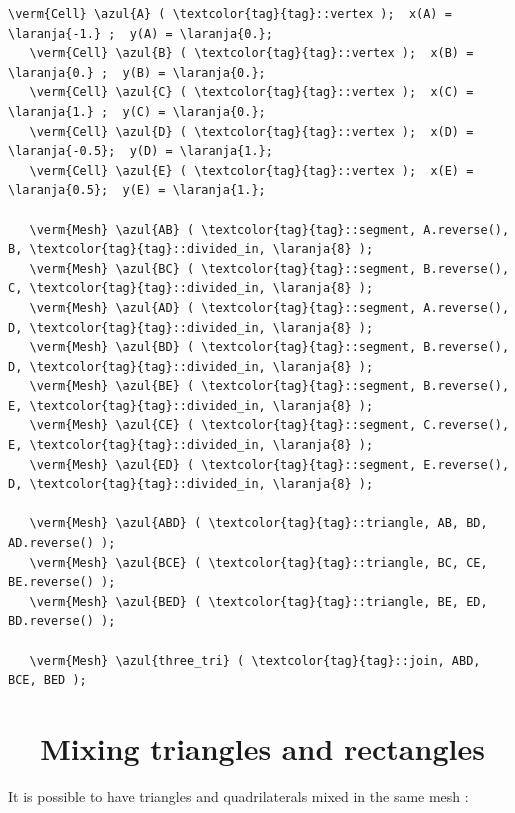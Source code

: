 \begin{Verbatim}[commandchars=\\\{\},formatcom=\small\tt,frame=single,
   label=parag-\ref{\numb section 1.\numb parag 4}.cpp,rulecolor=\color{coment},
   baselinestretch=0.94,framesep=2mm]
   \verm{Cell} \azul{A} ( \textcolor{tag}{tag}::vertex );  x(A) = \laranja{-1.} ;  y(A) = \laranja{0.};
   \verm{Cell} \azul{B} ( \textcolor{tag}{tag}::vertex );  x(B) =  \laranja{0.} ;  y(B) = \laranja{0.};
   \verm{Cell} \azul{C} ( \textcolor{tag}{tag}::vertex );  x(C) =  \laranja{1.} ;  y(C) = \laranja{0.};
   \verm{Cell} \azul{D} ( \textcolor{tag}{tag}::vertex );  x(D) = \laranja{-0.5};  y(D) = \laranja{1.};
   \verm{Cell} \azul{E} ( \textcolor{tag}{tag}::vertex );  x(E) =  \laranja{0.5};  y(E) = \laranja{1.};

   \verm{Mesh} \azul{AB} ( \textcolor{tag}{tag}::segment, A.reverse(), B, \textcolor{tag}{tag}::divided_in, \laranja{8} );
   \verm{Mesh} \azul{BC} ( \textcolor{tag}{tag}::segment, B.reverse(), C, \textcolor{tag}{tag}::divided_in, \laranja{8} );
   \verm{Mesh} \azul{AD} ( \textcolor{tag}{tag}::segment, A.reverse(), D, \textcolor{tag}{tag}::divided_in, \laranja{8} );
   \verm{Mesh} \azul{BD} ( \textcolor{tag}{tag}::segment, B.reverse(), D, \textcolor{tag}{tag}::divided_in, \laranja{8} );
   \verm{Mesh} \azul{BE} ( \textcolor{tag}{tag}::segment, B.reverse(), E, \textcolor{tag}{tag}::divided_in, \laranja{8} );
   \verm{Mesh} \azul{CE} ( \textcolor{tag}{tag}::segment, C.reverse(), E, \textcolor{tag}{tag}::divided_in, \laranja{8} );
   \verm{Mesh} \azul{ED} ( \textcolor{tag}{tag}::segment, E.reverse(), D, \textcolor{tag}{tag}::divided_in, \laranja{8} );

   \verm{Mesh} \azul{ABD} ( \textcolor{tag}{tag}::triangle, AB, BD, AD.reverse() );
   \verm{Mesh} \azul{BCE} ( \textcolor{tag}{tag}::triangle, BC, CE, BE.reverse() );
   \verm{Mesh} \azul{BED} ( \textcolor{tag}{tag}::triangle, BE, ED, BD.reverse() );

   \verm{Mesh} \azul{three_tri} ( \textcolor{tag}{tag}::join, ABD, BCE, BED );
\end{Verbatim}


\section{~~Mixing triangles and rectangles}\label{\numb section 1.\numb parag 5}

It is possible to have triangles and quadrilaterals mixed in the same mesh :

